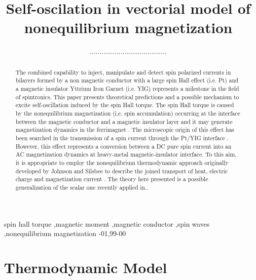 \documentclass[review]{elsarticle}
\begin{document}
\begin{frontmatter}
\title{Self-oscilation in vectorial model of nonequilibrium magnetization}


\author{........................................}
\address{Istituto Nazionale di Ricerca Metrologica (I.N.Ri.M.), Strada delle Cacce, 91, 10135 Torino, ITALY}


\begin{abstract}

The combined capability to inject, manipulate and detect spin polarized currents in bilayers formed by a non magnetic conductor with a large spin Hall effect (i.e. Pt) and a magnetic insulator Yttrium Iron Garnet (i.e. YIG) represents a milestone in the field of spintronics. This paper presents theoretical predictions and a possible mechanism to excite  self-oscillation induced by the spin Hall torque. The spin Hall torque is caused by the nonequilibrium magnetization (i.e. spin accumulation) occurring at the interface between the magnetic conductor and a magnetic insulator  layer and it may generate magnetization dynamics in the ferrimagnet \cite{collet2016generation}. The microscopic origin of this effect has been searched in the transmission of a spin current through the Pt/YIG interface \cite{tserkovnyak2002spin}. However,  this effect represents a conversion between a DC pure spin current into an AC magnetization dynamics at heavy-metal magnetic-insulator interface. To this aim, it is appropriate to employ the nonequilibrium thermodynamic approach originally developed by Johnson and Silsbee to describe the joined transport of heat, electric charge and magnetization current \cite{johnson1987thermodynamic}. The theory here presented is a possible generalization of the scalar one recently applied in.\cite{basso2016nonequilibrium, basso2016thermodynamic}. 

\end{abstract}

\begin{keyword}
spin hall torque \sep magnetic moment \sep magnetic conductor \sep spin waves \sep nonequilibrium magnetization 
-01\sep  99-00
\end{keyword}

\end{frontmatter}

\linenumbers

\section{Thermodynamic Model}
\end{document}
